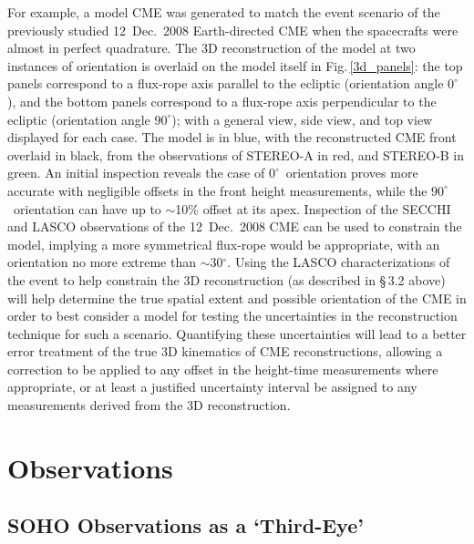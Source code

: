 \documentclass[preprint2]{aastex}
\begin{document}
For example, a model CME was generated to match the event scenario of the previously studied 12~Dec.~2008 Earth-directed CME when the spacecrafts were almost in perfect quadrature. The 3D reconstruction of the model at two instances of orientation is overlaid on the model itself in Fig.\,\ref{3d_panels}: the top panels correspond to a flux-rope axis parallel to the ecliptic (orientation angle $0^{\circ}$), and the bottom panels correspond to a flux-rope axis perpendicular to the ecliptic (orientation angle $90^{\circ}$); with a general view, side view, and top view displayed for each case. The model is in blue, with the reconstructed CME front overlaid in black, from the observations of STEREO-A in red, and STEREO-B in green. An initial inspection reveals the case of $0^{\circ}$~orientation proves more accurate with negligible offsets in the front height measurements, while the $90^{\circ}$~orientation can have up to $\sim$10\% offset at its apex. Inspection of the SECCHI and LASCO observations of the 12~Dec.~2008 CME can be used to constrain the model, implying a more symmetrical flux-rope would be appropriate, with an orientation no more extreme than $\sim$30$^{\circ}$. Using the LASCO characterizations of the event to help constrain the 3D reconstruction (as described in \S\,3.2 above) will help determine the true spatial extent and possible orientation of the CME in order to best consider a model for testing the uncertainties in the reconstruction technique for such a scenario. Quantifying these uncertainties will lead to a better error treatment of the true 3D kinematics of CME reconstructions, allowing a correction to be applied to any offset in the height-time measurements where appropriate, or at least a justified uncertainty interval be assigned to any measurements derived from the 3D reconstruction.


\section{Observations}

\subsection{SOHO Observations as a `Third-Eye'}
\end{document}
